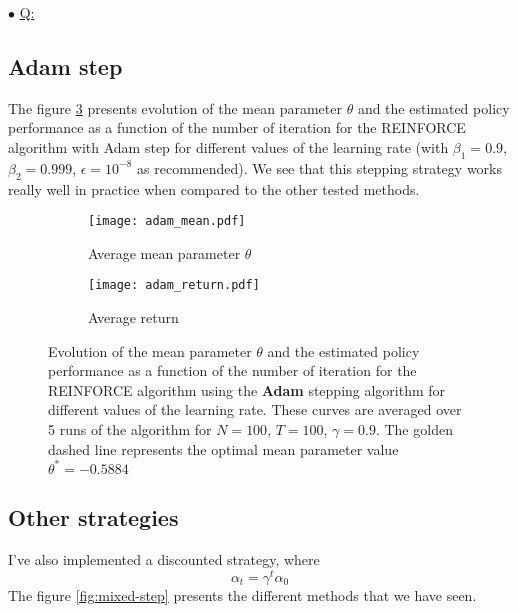 \documentclass[a4paper, 11pt]{article}
\newcounter{cquestion}
\renewcommand{\thecquestion}{\arabic{cquestion}}
\newenvironment{question}
{\par \vspace{0.5em} \noindent \stepcounter{cquestion} \hspace{-1em}
 $\bullet$ \underline{Q\thecquestion :}}
{}
\begin{document}
\begin{question}
  \subsection{Adam step}

  The figure \ref{fig:adam-step} presents evolution of the mean
  parameter $\theta$ and the estimated policy performance as a
  function of the number of iteration for the REINFORCE algorithm with
  Adam step for different values of the learning rate (with
  $\beta_1 = 0.9$, $\beta_2 = 0.999$, $\epsilon = 10^{-8}$ as
  recommended). We see that this stepping strategy works really well
  in practice when compared to the other tested methods.

  \begin{figure}[ht]
    \centering
    \begin{subfigure}[t]{0.48\textwidth}
      \centering
      \texttt{[image: adam\_mean.pdf]}
      \caption{Average mean parameter $\theta$}\label{fig:adam-mean.pdf}
    \end{subfigure}
    \quad
    \begin{subfigure}[t]{0.48\textwidth}
      \centering
      \texttt{[image: adam\_return.pdf]}
      \caption{Average return}\label{fig:adam-return.pdf}
    \end{subfigure}
    \caption{Evolution of the mean parameter $\theta$ and the
      estimated policy performance as a function of the number of
      iteration for the REINFORCE algorithm using the \textbf{Adam}
      stepping algorithm for different values of the learning
      rate. These curves are averaged over 5 runs of the algorithm for
      $N = 100$, $T = 100$, $\gamma = 0.9$. The golden dashed line
      represents the optimal mean parameter value
      $\theta^* = -0.5884$}\label{fig:adam-step}
  \end{figure}


  \newpage
  \subsection{Other strategies}

  I've also implemented a discounted strategy, where
  \begin{displaymath}
    \alpha_t = \gamma^t \alpha_0
  \end{displaymath}
  The figure \ref{fig:mixed-step} presents the different methods that
  we have seen.


\end{question}
\end{document}
